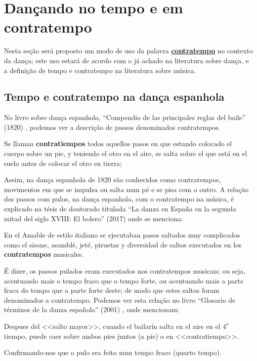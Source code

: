 
\section{Dançando no tempo e em contratempo}

Nesta seção será proposto um modo de uso da palavra 
\hyperref[sec:contratempo]{\textbf{contratempo}} no contexto da dança;
este uso estará de acordo com o já achado na literatura  sobre dança,
e a definição de tempo e contratempo na literatura sobre música.

\subsection{Tempo e contratempo na dança espanhola}
\label{subsec:contratempoespanha}
No livro sobre dança espanhola, ``Compendio de las principales reglas del baile'' (1820) \cite[pp. 131]{cairon1820compendio},
podemos ver a descrição de passos denominados contratempos.
\begin{citando}
Se llaman \textbf{contratiempos} todos aquellos pasos en que estando colocado el cuerpo sobre un pie,
y teniendo el otro en el aire,
se salta sobre el que está en el suelo antes de colocar el otro en tierra;
\end{citando}
Assim, na dança espanhola de 1820 são conhecidos como contratempos,
movimentos em que se impulsa ou salta num pé e se pisa com o outro. 
A relação dos passos com pulos, na dança espanhola, 
com o contratempo na música, 
é explicado na tésis de doutorado titulada 
``La danza en España en la segunda mitad del siglo XVIII: El bolero'' (2017)
\cite[pp. 160]{martin2017danza} onde se menciona:
\begin{citando}
En el Amable de estilo italiano se ejecutaban pasos saltados muy complicados como el sisone,
asamblé, jeté, piruetas y diversidad de saltos executados en los \textbf{contratempos} musicales.
\end{citando}
É dizer, os passos pulados eram executados nos contratempos musicais;
ou seja, acentuando mais o tempo fraco que o tempo forte,
ou acentuando mais a parte fraca do tempo que a parte forte deste;
de modo que estes saltos foram denominados a contratempo.
Podemos ver esta relação no livro ``Glosario de términos de la danza española'' (2001)
\cite[pp. 109]{aubero2001glosario}, onde mencionam:
\begin{citando}
Despues del <<salto mayor>>, cuando el bailarín salta en el aire en el $4^o$ tiempo,
puede caer sobre ambos pies juntos (a pie) o en <<contratiempo>>.
\end{citando}
Confirmando-nos que o pulo era feito num tempo fraco (quarto tempo).



